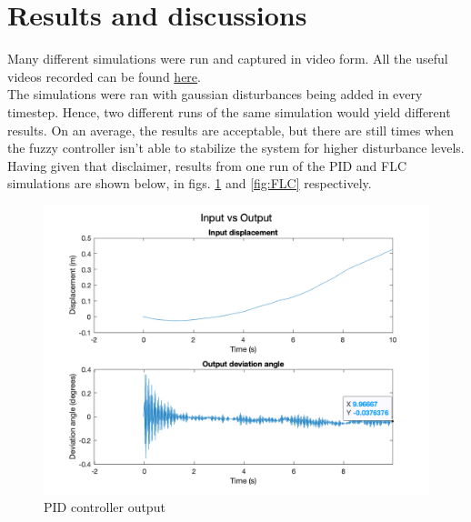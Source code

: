 \section{Results and discussions}

Many different simulations were run and captured in video form. All the useful videos recorded can be found \href{https://drive.google.com/drive/folders/1YSsqFpuCf-zBKHXfOGs2zDYO57xDAOi-?usp=sharing}{here}. \\

The simulations were ran with gaussian disturbances being added in every timestep. Hence, two different runs of the same simulation would yield different results. On an average, the results are acceptable, but there are still times when the fuzzy controller isn't able to stabilize the system for higher disturbance levels. \\

Having given that disclaimer, results from one run of the PID and FLC simulations are shown below, in figs. \ref{fig:PID} and \ref{fig:FLC} respectively. 

\begin{figure}[h!]
    \centering
    \includegraphics[scale=0.35]{images/PID.png}
    \caption{ PID controller output }
    \label{fig:PID}
\end{figure}

\pagebreak

